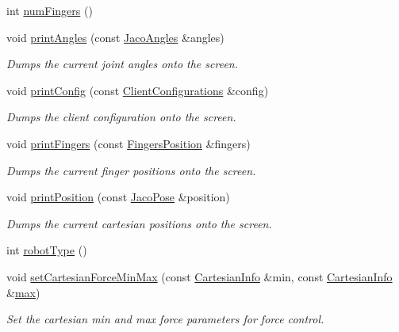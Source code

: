 \begin{DoxyCompactItemize}
\item 
int \hyperlink{classjaco_1_1JacoComm_a42e11ee165ee8f2b1af7e7060f488ce1}{num\+Fingers} ()
\item 
void \hyperlink{classjaco_1_1JacoComm_a0524faa99cdc1361d50c3c6a53d5cfe0}{print\+Angles} (const \hyperlink{classjaco_1_1JacoAngles}{Jaco\+Angles} \&angles)
\begin{DoxyCompactList}\small\item\em Dumps the current joint angles onto the screen. \end{DoxyCompactList}\item 
void \hyperlink{classjaco_1_1JacoComm_a54661eeda2fc5324843a230bdcfe8b67}{print\+Config} (const \hyperlink{KinovaTypes_8h_d1/d2e/structClientConfigurations}{Client\+Configurations} \&config)
\begin{DoxyCompactList}\small\item\em Dumps the client configuration onto the screen. \end{DoxyCompactList}\item 
void \hyperlink{classjaco_1_1JacoComm_ab34f7cbb2978e76644927b9031e06b4f}{print\+Fingers} (const \hyperlink{structFingersPosition}{Fingers\+Position} \&fingers)
\begin{DoxyCompactList}\small\item\em Dumps the current finger positions onto the screen. \end{DoxyCompactList}\item 
void \hyperlink{classjaco_1_1JacoComm_ac1abf65387fa9adba237802bc97f15b1}{print\+Position} (const \hyperlink{classjaco_1_1JacoPose}{Jaco\+Pose} \&position)
\begin{DoxyCompactList}\small\item\em Dumps the current cartesian positions onto the screen. \end{DoxyCompactList}\item 
int \hyperlink{classjaco_1_1JacoComm_af20323ed50f73b59bac3e18ebd8559fa}{robot\+Type} ()
\item 
void \hyperlink{classjaco_1_1JacoComm_a39faaf774115561ea1857349db182145}{set\+Cartesian\+Force\+Min\+Max} (const \hyperlink{structCartesianInfo}{Cartesian\+Info} \&min, const \hyperlink{structCartesianInfo}{Cartesian\+Info} \&\hyperlink{JacoPositionConfig_8dox_a55c9de72d9f3630abdf51bfe39c191dd}{max})
\begin{DoxyCompactList}\small\item\em Set the cartesian min and max force parameters for force control. \end{DoxyCompactList}\item 

\end{DoxyCompactItemize}
